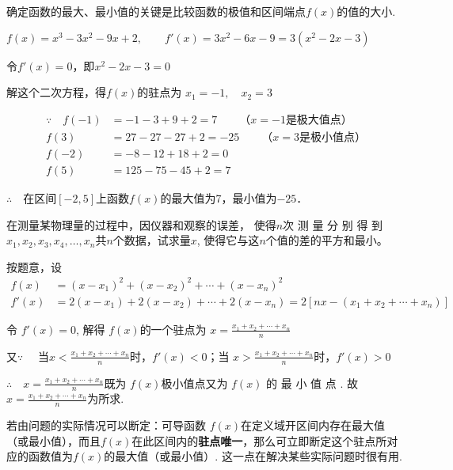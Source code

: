 \begin{analyze}
    确定函数的最大、最小值的关键是比较函数的极值和区间端点$f(x)$的值的大小.
\end{analyze}

\begin{solution}
$f(x)=x^3-3x^2-9x+2,\qquad 
f'(x)=3x^2-6x-9=3(x^2-2x-3)$

令$f'(x)=0$，即$x^2-2x-3=0$

解这个二次方程，得$f(x)$的驻点为
$x_1=-1,\quad x_2=3$

\[\begin{split}
    \because\quad f(-1)&=-1-3+9+2=7\qquad \text{（$x=-1$是极大值点）}\\
f(3)&=27-27-27+2=-25\qquad  \text{（$x=3$是极小值点）}\\
f(-2)&=-8-12+18+2=0\\
f(5)&=125-75-45+2=7
\end{split}\]

$\therefore\quad $在区间$[-2,5]$上函数$f(x)$的最大值为7，最小值为$-25$．
\end{solution}

\begin{example}
    在测量某物理量的过程中，因仪器和观察的误差， 使得$n$次 测 量 分 别 得 到$x_1, x_2, x_3, x_4,\ldots , x_n$共$n$个数据，试求量$x$, 使得它与这$n$个值的差的平方和最小。
\end{example}

\begin{solution}
按题意，设
\[\begin{split}
    f(x)&=(x-x_{1})^{2}+(x-x_{2})^{2}+\cdots+(x-x_{n})^{2}\\
   f'(x)&=2(x-x_{1})+2(x-x_{2})+\cdots+2(x-x_{n})=2[nx-(x_{1}+x_{2}+\cdots+x_{n})]
\end{split}\]

令 $f'(x)=0$, 解得 $f(x)$的一个驻点为
$x=\frac{x_{1}+x_{2}+\cdots+x_{n}}{n}$

又$\because\quad$ 当$x< \frac {x_{1}+ x_{2}+ \cdots + x_{n}}n$时，$f'(x)<0$；当
$x>\frac{x_1+x_2+\cdots+x_n}n$时，$f'(x)>0$

$\therefore\quad x= \frac {x_{1}+ x_{2}+ \cdots + x_{n}}n$既为 $f(x)$极小值点又为 $f(x)$
的 最 小 值 点 . 故  $x= \frac {x_{1}+ x_{2}+ \cdots + x_{n}}n$为所求.
  \end{solution}

\begin{rmk}
    若由问题的实际情况可以断定：可导函数 $f(x)$在定义域开区间内存在最大值（或最小值），而且$f(x)$在此区间内的\textbf{驻点唯一}，那么可立即断定这个驻点所对应的函数值为$f(x)$的最大值（或最小值）. 这一点在解决某些实际问题时很有用.
\end{rmk}

